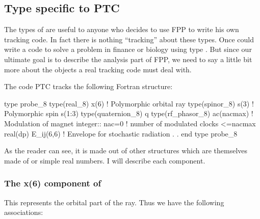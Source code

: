 \documentclass[english,12pt,article]{article} %
\begin{document}
  \subsection{Type   \protect{}  specific to PTC}\label{sec:codetype}

The types of  are useful to anyone who decides to use FPP to write his own tracking code. In fact there is nothing ``tracking'' about these types. Once could write a code to solve a problem in finance or biology using  type . But since our ultimate goal is to describe the analysis part of FPP, we need to say a little bit more about the objects a real tracking code must deal with.

The code PTC tracks the following Fortran structure:
  

  \begin{example}
    type probe_8
     type(real_8) x(6)     ! Polymorphic orbital ray
     type(spinor_8) s(3)   ! Polymorphic spin s(1:3)
     type(quaternion_8) q 
     type(rf_phasor_8)  ac(nacmax)  ! Modulation of magnet
     integer:: nac=0 !  number of modulated clocks <=nacmax
     real(dp) E_ij(6,6)   !  Envelope for stochastic radiation
           .
           .
  end type probe_8
    \end{example}

As the reader can see, it is made out of other structures which are themselves made of  or simple real numbers.  I will describe each component.

 
  
  

  \subsubsection{The   x(6) component of   }\label{sec:codetype}

 This represents the orbital part of the ray. Thus we have the following associations:
 
\end{document}
